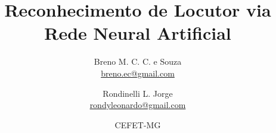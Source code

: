 
\title{\vspace{-15mm}\fontsize{14pt}{10pt}\selectfont\textbf{Reconhecimento de Locutor via Rede Neural Artificial}} %

\author{
    Breno M. C. C. e Souza\\
    \href{mailto:breno.ec@gmail.com}{breno.ec@gmail.com}\\
  \and
    Rondinelli L. Jorge\\
    \href{mailto:rondyleonardo@gmail.com}{rondyleonardo@gmail.com}\\
}

\date{CEFET-MG} %

